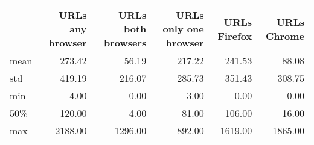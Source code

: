 \begin{tabular}{lrrrrr}
\toprule
{} &  URLs any browser &  URLs both browsers &  URLs  only one browser &  URLs Firefox &  URLs Chrome \\
\midrule
mean &            273.42 &               56.19 &                  217.22 &        241.53 &        88.08 \\
std  &            419.19 &              216.07 &                  285.73 &        351.43 &       308.75 \\
min  &              4.00 &                0.00 &                    3.00 &          0.00 &         0.00 \\
50\% &            120.00 &                4.00 &                   81.00 &        106.00 &        16.00 \\
max  &           2188.00 &             1296.00 &                  892.00 &       1619.00 &      1865.00 \\
\bottomrule
\end{tabular}

